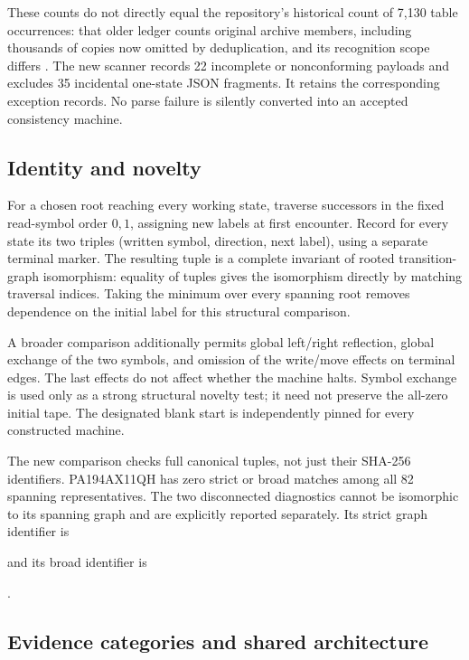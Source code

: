 \documentclass[11pt,letterpaper]{article}
\theoremstyle{definition}\newtheorem{definition}[theorem]{Definition}
\theoremstyle{remark}\newtheorem{remark}[theorem]{Remark}
\newcommand{\file}[1]{\path{#1}}
\begin{document}
These counts do not directly equal the repository's historical count of
7,130 table occurrences: that older ledger counts original archive members,
including thousands of copies now omitted by deduplication, and its
recognition scope differs \cite{machineledger}. The new scanner records 22
incomplete or nonconforming \file{.tm} payloads and excludes 35 incidental
one-state JSON fragments. It retains the corresponding exception records.
No parse failure is silently converted into an accepted consistency machine.

\subsection{Identity and novelty}

For a chosen root reaching every working state, traverse successors in the
fixed read-symbol order $0,1$, assigning new labels at first encounter.
Record for every state its two triples (written symbol, direction, next
label), using a separate terminal marker. The resulting tuple is a
complete invariant of rooted transition-graph isomorphism: equality of
tuples gives the isomorphism directly by matching traversal indices.
Taking the minimum over every spanning root removes dependence on the
initial label for this structural comparison.

A broader comparison additionally permits global left/right reflection,
global exchange of the two symbols, and omission of the write/move effects
on terminal edges. The last effects do not affect whether the machine
halts. Symbol exchange is used only as a strong structural novelty test;
it need not preserve the all-zero initial tape. The designated blank start
is independently pinned for every constructed machine.

The new comparison checks full canonical tuples, not just their SHA-256
identifiers. PA194AX11QH has zero strict or broad matches among all 82
spanning representatives. The two disconnected diagnostics cannot be
isomorphic to its spanning graph and are explicitly reported separately.
Its strict graph identifier is
\begin{center}\small{}\end{center}
and its broad identifier is
\begin{center}\small{}.\end{center}

\subsection{Evidence categories and shared architecture}
\end{document}
